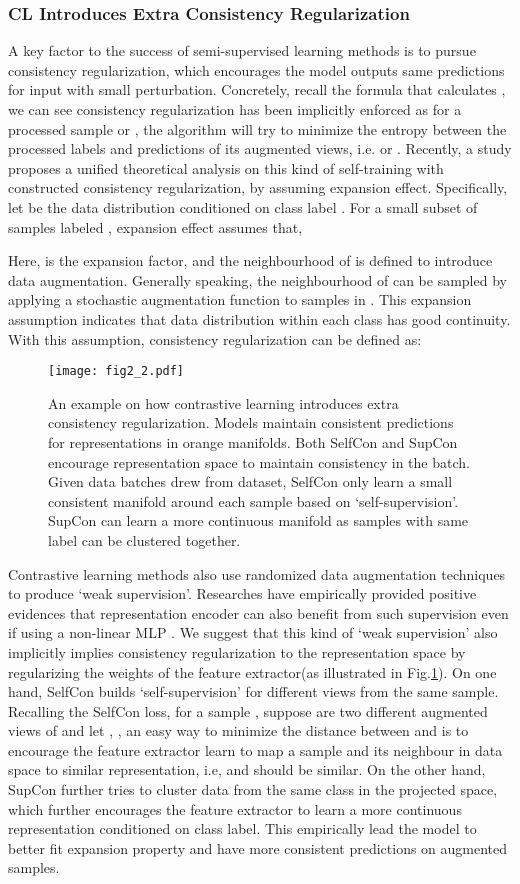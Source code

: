 \documentclass[letterpaper]{article} \usepackage{aaai22}  \usepackage{times}  \usepackage{helvet}  \usepackage{courier}  \usepackage[hyphens]{url}  \usepackage{graphicx} \usepackage{subfigure}
\begin{document}
\subsubsection{CL Introduces Extra Consistency Regularization }
A key factor to the success of semi-supervised learning methods is to pursue consistency regularization, which encourages the model outputs same predictions for input with small perturbation. Concretely, recall the formula that calculates , we can see consistency regularization has been implicitly enforced as for a processed sample  or , the algorithm will try to minimize the entropy between the processed labels and predictions of its augmented views, i.e.  or . Recently, a study \cite{wei2020theoretical} proposes a unified theoretical analysis on this kind of self-training with constructed consistency regularization, by assuming expansion effect. Specifically, let  be the data distribution conditioned on class label . For a small subset  of samples labeled , expansion effect assumes that, 

Here,  is the expansion factor, and the neighbourhood of  is defined to introduce data augmentation. Generally speaking, the neighbourhood of  can be sampled by applying a stochastic augmentation function to samples in . This expansion assumption indicates that data distribution within each class has good continuity. With this assumption, consistency regularization can be defined as:

\begin{figure}[t]
\centering
\texttt{[image: fig2\_2.pdf]}
\caption{An example on how contrastive learning introduces extra consistency regularization. Models maintain consistent predictions for representations in orange manifolds. Both SelfCon and SupCon encourage representation space to maintain consistency in the batch. Given data batches drew from dataset, SelfCon only learn a small consistent manifold around each sample based on `self-supervision'. SupCon can learn a more continuous manifold as samples with same label can be clustered together.}
\label{fig2}
\end{figure}
Contrastive learning methods also use randomized data augmentation techniques to produce `weak supervision'. Researches have empirically provided positive evidences that representation encoder can also benefit from such supervision even if using a non-linear MLP . We suggest that this kind of `weak supervision' also implicitly implies consistency regularization to the representation space by regularizing the weights of the feature extractor(as illustrated in Fig.\ref{fig2}). On one hand, SelfCon builds `self-supervision' for different views from the same sample. Recalling the SelfCon loss, for a sample , suppose  are two different augmented views of  and let , , an easy way to minimize the distance between  and  is to encourage the feature extractor learn to map a sample and its neighbour in data space to similar representation, i.e,  and  should be similar. On the other hand, SupCon further tries to cluster data from the same class in the projected space, which further encourages the feature extractor to learn a more continuous representation conditioned on class label. This empirically lead the model to better fit expansion property and have more consistent predictions on augmented samples. 
\end{document}
